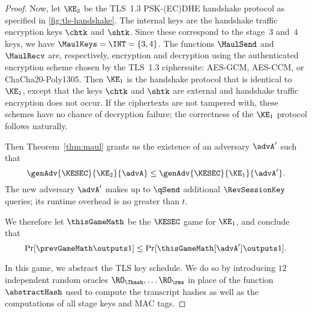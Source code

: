 \begin{proof}
	Now, let $\KE_2$ be the TLS~1.3 PSK-(EC)DHE handshake protocol as specified in \autoref{fig:tls-handshake}.
	The internal keys are the handshake traffic encryption keys $\chtk$ and $\shtk$.
	Since these correspond to the stage~$3$ and~$4$ keys, we have $\MaulKeys = \INT = \{3,4\}$.
	The functions $\MaulSend$ and $\MaulRecv$ are, respectively, encryption and decryption using the authenticated encryption scheme chosen by the TLS~1.3 ciphersuite: AES-GCM, AES-CCM, or ChaCha20-Poly1305.
	Then $\KE_1$ is the handshake protocol that is identical to $\KE_1$, except that the keys $\chtk$ and $\shtk$ are external and handshake traffic encryption does not occur.
	If the ciphertexts are not tampered with, these schemes have no chance of decryption failure; the correctness of the $\KE_1$ protocol follows naturally.
	
	Then Theorem~\ref{thm:maul} grants us the existence of an adversary $\advA'$ such that 
	\[ 
		\genAdv{\KESEC}{\KE_2}{\advA} \leq \genAdv{\KESEC}{\KE_1}{\advA'}.
	\]
	The new adversary $\advA'$ makes up to $\qSend$ additional $\RevSessionKey$ queries; its runtime overhead is no greater than $t$.
	
	We therefore let $\thisGameMath$ be the $\KESEC$ game for $\KE_1$, and conclude that 
	\[
		\Pr[ \prevGameMath \outputs 1 ] \leq \Pr[ \thisGameMath[\advA'] \outputs 1 ].
	\]
		
	In this game, we abstract the TLS key schedule.
	We do so by introducing $12$ independent random oracles $\RO_\Thash, \dotsc \RO_\rms$ in place of the function $\abstractHash$
	used to compute the transcript hashes as well as the computations of all stage keys and MAC tags.
	

\end{proof}
